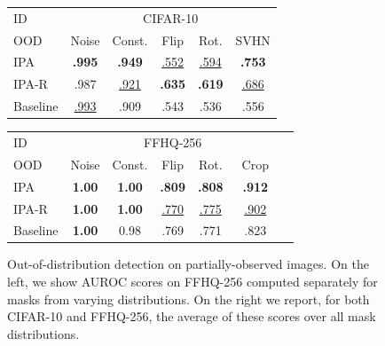 \begin{figure}[t]
\begin{minipage}{.58\textwidth}
  \begin{tabular}{lccccc}
    \toprule
    ID & \multicolumn{5}{c}{CIFAR-10}  \\
    \cmidrule(r){2-6}
    OOD & Noise & Const. & Flip & Rot. & SVHN \\
    \midrule
    IPA      & \textbf{.995} & \textbf{.949} & \underline{.552} & \underline{.594} & \textbf{.753}    \\
    IPA-R    & .987         & \underline{.921}                  & \textbf{.635}    & \textbf{.619}    & \underline{.686} \\
    Baseline  & \underline{.993} & .909 & .543             & .536             & .556             \\
    \bottomrule
  \end{tabular}
  \newline
  \vspace*{.1cm}
  \newline
  \begin{tabular}{lcccccc}
    \toprule
    ID & \multicolumn{5}{c}{FFHQ-256}  \\
    \cmidrule(r){2-6}
    OOD         & Noise & Const. & Flip & Rot. & ~Crop~ \\
    \midrule
    IPA         & \textbf{1.00} & \textbf{1.00} & \textbf{.809}    & \textbf{.808}    & \textbf{.912}    \\
    IPA-R       & \textbf{1.00} & \textbf{1.00} & \underline{.770} & \underline{.775} & \underline{.902} \\
    Baseline     & \textbf{1.00} & 0.98  & .769 & .771             & .823             \\
    \bottomrule
  \end{tabular}

\end{minipage}%
\caption{Out-of-distribution detection on partially-observed images. On the left, we show AUROC scores
  on FFHQ-256 computed separately for masks from varying distributions. On the
  right we report, for both CIFAR-10 and FFHQ-256, the average of these scores
  over all mask distributions.}
\label{fig:cigcvae-ood-results}
\end{figure}

